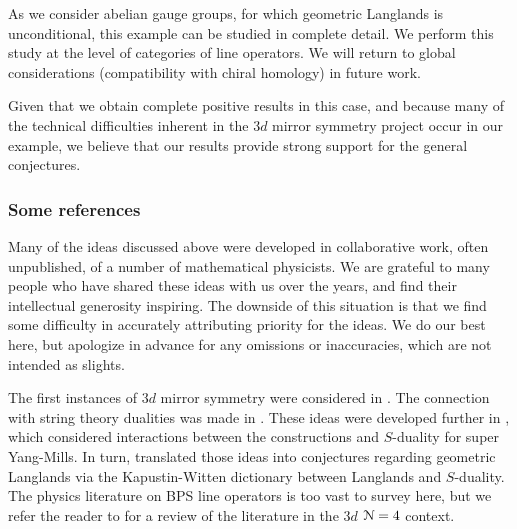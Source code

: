 \documentclass[reqno,11pt]{amsart}
\numberwithin{equation}{subsection}
\theoremstyle{remark}
\newcommand{\sN}{{\EuScript N}}
\begin{document}
As we consider abelian gauge groups,
for which geometric Langlands is unconditional, this example can be 
studied in complete detail. 
We perform this study at the level of categories of line operators. We will
return to global considerations (compatibility with chiral homology) in 
future work.

Given that we obtain complete positive results in this case, and
because many of the technical difficulties inherent in the $3d$ mirror symmetry
project occur in our example, we believe that our results provide strong
support for the general conjectures. 

\subsubsection{Some references}\label{ss:3d-refs}

Many of the ideas discussed above were developed in 
collaborative work, often unpublished, of a number of mathematical physicists. 
We are grateful to many people who have shared these ideas
with us over the years, and find their intellectual generosity inspiring.
The downside of this situation is that we find some difficulty in accurately
attributing priority for the ideas. We do our best here, but apologize in 
advance for any omissions or inaccuracies, which are not intended as slights.

The first instances of $3d$ mirror symmetry were considered in 
\cite{intriligator-seiberg}. The connection with string theory dualities
was made in \cite{hanany-witten}. These ideas were developed further
in \cite{gaiotto-witten}, which considered interactions between the
\cite{hanany-witten} constructions and $S$-duality for super Yang-Mills.
In turn, \cite{gaiotto-s} translated those ideas into conjectures regarding
geometric Langlands via the Kapustin-Witten dictionary \cite{kapustin-witten}
between Langlands and $S$-duality. The physics literature on BPS line operators 
is too vast to survey here, but we refer the reader to \cite{dggh} for a
review of the literature in the $3d$ $\sN = 4$ context. 
\end{document}
